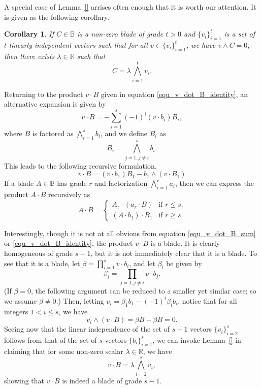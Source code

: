 \documentclass{birkjour}
\newtheorem{cor}[thm]{Corollary}
\theoremstyle{definition}
\theoremstyle{remark}
\numberwithin{equation}{section}
\newcommand{\R}{\mathbb{R}}
\newcommand{\B}{\mathbb{B}}
\begin{document}
A special case of Lemma~\ref{} arrises often enough that it is worth our attention.
It is given as the following corollary.
\begin{cor}
If $C\in\B$ is a non-zero blade of grade $t>0$ and $\{v_i\}_{i=1}^t$ is a set
of $t$ linearly independent vectors such that for all $v\in\{v_i\}_{i=1}^t$,
we have $v\wedge C=0$, then there exists $\lambda\in\R$ such that
\begin{equation*}
C = \lambda\bigwedge_{i=1}^t v_i.
\end{equation*}
\end{cor}

Returning to the product $v\cdot B$ given in equation \eqref{equ_v_dot_B_identity},
an alternative expansion is given by
\begin{equation}\label{equ_v_dot_B_sum}
v\cdot B = -\sum_{i=1}^s (-1)^i(v\cdot b_i)B_i,
\end{equation}
where $B$ is factored as $\bigwedge_{i=1}^s b_i$, and we define $B_i$ as
\begin{equation*}
B_i = \bigwedge_{j=1,j\neq i}^s b_i.
\end{equation*}
This leads to the following recursive formulation.
\begin{equation*}
v\cdot B=(v\cdot b_1)B_1-b_1\wedge(v\cdot B_1)
\end{equation*}
If a blade $A\in\B$ has grade $r$ and factorization $\bigwedge_{i=1}^r a_i$, then
we can express the product $A\cdot B$ recursively as
\begin{equation*}
A\cdot B = \left\{\begin{array}{ll}
A_r\cdot (a_r\cdot B) & \mbox{if $r\leq s$,} \\
(A\cdot b_1)\cdot B_1 & \mbox{if $r\geq s$.}
\end{array}\right.
\end{equation*}

Interestingly, though it is not at all obvious from equation \eqref{equ_v_dot_B_sum}
or \eqref{equ_v_dot_B_identity}, the product
$v\cdot B$ is a blade.  It is clearly homogeneous of grade $s-1$, but it is not
immediately clear that it is a blade.  To see that it is a blade, let $\beta=\prod_{i=1}^s v\cdot b_i$,
and let $\beta_i$ be given by
\begin{equation*}
\beta_i=\prod_{j=1,j\neq i}v\cdot b_j.
\end{equation*}
(If $\beta=0$, the following argument can be reduced to a smaller yet similar case; so
we assume $\beta\neq 0$.)
Then, letting $v_i=\beta_1b_1-(-1)^i\beta_ib_i$, notice that for all integers $1<i\leq s$,
we have
\begin{equation*}
v_i\wedge (v\cdot B)=\beta B-\beta B=0.
\end{equation*}
Seeing now that the linear independence of the set of $s-1$ vectors
$\{v_i\}_{i=2}^s$ follows from that of the set of $s$ vectors $\{b_i\}_{i=1}^s$,
we can invoke Lemma~\ref{} in claiming that for some non-zero scalar $\lambda\in\R$,
we have
\begin{equation*}
v\cdot B = \lambda\bigwedge_{i=2}^s v_i,
\end{equation*}
showing that $v\cdot B$ is indeed a blade of grade $s-1$.
\end{document}
